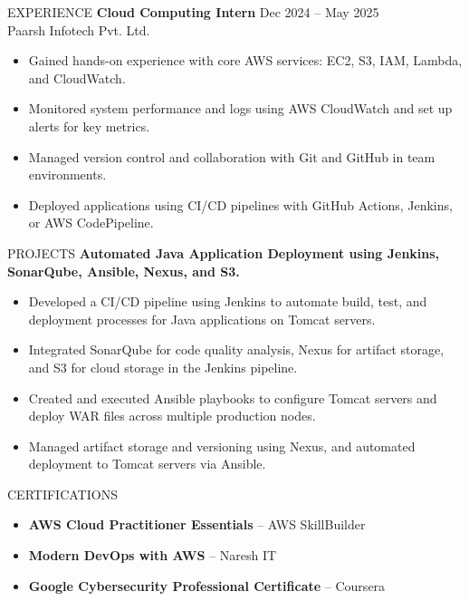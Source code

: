 \documentclass{resume} %
\begin{document}
\begin{rSection}{EXPERIENCE}
\textbf{Cloud Computing Intern} \hfill Dec 2024 -- May 2025 \\
Paarsh Infotech Pvt. Ltd. 
\begin{itemize}
    \itemsep -3pt {}
    \item Gained hands-on experience with core AWS services: EC2, S3, IAM, Lambda, and CloudWatch.
    \item Monitored system performance and logs using AWS CloudWatch and set up alerts for key metrics.
    \item Managed version control and collaboration with Git and GitHub in team environments.
    \item Deployed applications using CI/CD pipelines with GitHub Actions, Jenkins, or AWS CodePipeline.
\end{itemize}
\end{rSection}

\begin{rSection}{PROJECTS}
\textbf{Automated Java Application Deployment using Jenkins, SonarQube, Ansible, Nexus, and S3.}  
\begin{itemize}
    \item Developed a CI/CD pipeline using Jenkins to automate build, test, and deployment processes for Java applications on Tomcat servers.
    \item Integrated SonarQube for code quality analysis, Nexus for artifact storage, and S3 for cloud storage in the Jenkins pipeline.
    \item Created and executed Ansible playbooks to configure Tomcat servers and deploy WAR files across multiple production nodes.
    \item Managed artifact storage and versioning using Nexus, and automated deployment to Tomcat servers via Ansible.
\end{itemize}
\end{rSection}
\begin{rSection}{CERTIFICATIONS}
\begin{itemize}
    \item \textbf{AWS Cloud Practitioner Essentials} -- AWS SkillBuilder
    \item \textbf{Modern DevOps with AWS} -- Naresh IT 
    \item \textbf{Google Cybersecurity Professional Certificate} -- Coursera
\end{itemize}
\end{rSection}
\end{document}
